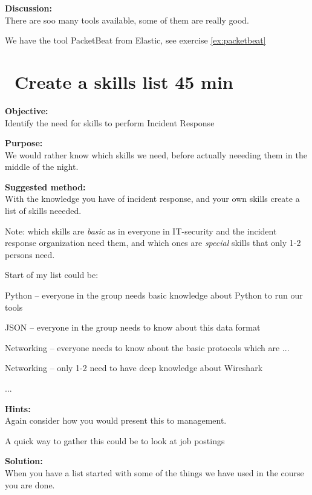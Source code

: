 \documentclass[a4paper,11pt,notitlepage]{report}
\begin{document}
{\bf Discussion:}\\
There are soo many tools available, some of them are really good.

We have the tool PacketBeat from Elastic, see exercise \ref{ex:packetbeat}


\chapter{\faExclamationTriangle\ Create a skills list 45 min}
\label{ex:skills-list}



{\bf Objective:}\\
Identify the need for skills to perform Incident Response


{\bf Purpose:}\\
We would rather know which skills we need, before actually neeeding them in the middle of the night.

{\bf Suggested method:}\\
With the knowledge you have of incident response, and your own skills create a list of skills neeeded.

Note: which skills are \emph{basic} as in everyone in IT-security and the incident response organization need them, and which ones are \emph{special} skills that only 1-2 persons need.

Start of my list could be:
\begin{list2}
\item Python -- everyone in the group needs basic knowledge about Python to run our tools
\item JSON -- everyone in the group needs to know about this data format
\item Networking -- everyone needs to know about the basic protocols which are ...
\item Networking -- only 1-2 need to have deep knowledge about Wireshark
\item ...
\end{list2}

{\bf Hints:}\\
Again consider how you would present this to management.

A quick way to gather this could be to look at job postings

{\bf Solution:}\\
When you have a list started with some of the things we have used in the course you are done.
\end{document}
